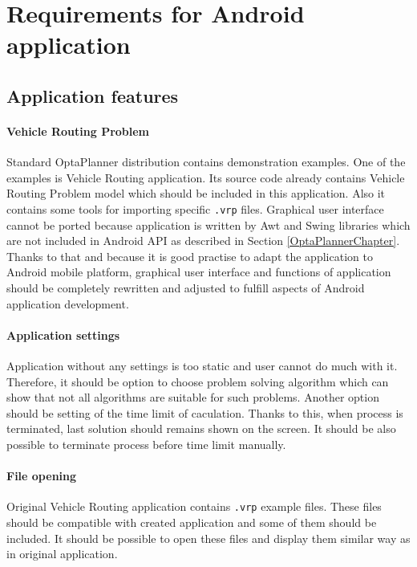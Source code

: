 

\section{Requirements for Android application}

\subsection{Application features}\label{FeaturesSection}

\paragraph{Vehicle Routing Problem}
Standard OptaPlanner distribution \cite{OptaPlannerDistribution} contains demonstration examples. One of the examples is
Vehicle Routing application. Its source code already contains Vehicle Routing Problem model which should be included in
this application. Also it contains some tools for importing specific \texttt{.vrp} files. Graphical user interface
cannot be ported because application is written by Awt and Swing libraries which are not included in Android API as
described in Section \ref{OptaPlannerChapter}. Thanks to that and because it is good practise to adapt the application
to Android mobile platform, graphical user interface and functions of application should be completely rewritten and
adjusted to fulfill aspects of Android application development.

\paragraph{Application settings}
Application without any settings is too static and user cannot do much with it. Therefore, it should be option to choose
problem solving algorithm which can show that not all algorithms are suitable for such problems. Another option should
be setting of the time limit of caculation. Thanks to this, when process is terminated, last solution should remains
shown on the screen. It should be also possible to terminate process before time limit manually.

\paragraph{File opening}
Original Vehicle Routing application contains \texttt{.vrp} example files. These files should be compatible with created
application and some of them should be included. It should be possible to open these files and display them similar way
as in original application.

